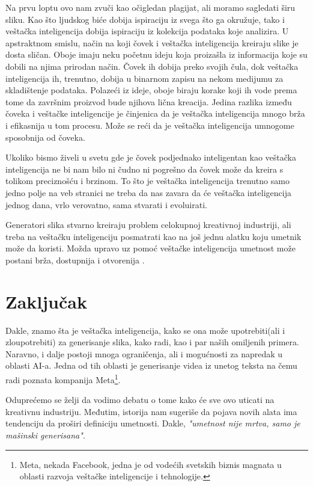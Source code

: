 \documentclass[12pt, letterpaper]{article}
\begin{document}
Na prvu loptu ovo nam zvuči kao očigledan plagijat, ali moramo sagledati širu sliku. Kao što ljudskog biće dobija ispiraciju iz svega što ga okružuje, tako i veštačka inteligencija dobija ispiraciju iz kolekcija podataka koje analizira. U apstraktnom smislu, način na koji čovek i veštačka inteligencija kreiraju slike je dosta sličan. Oboje imaju neku početnu ideju koja proizašla iz informacija koje su dobili na njima prirodan način. Čovek ih dobija preko svojih čula, dok veštačka inteligencija ih, trenutno, dobija u binarnom zapisu na nekom medijumu za skladištenje podataka. Polazeći iz ideje, oboje biraju korake koji ih vode prema tome da završnim proizvod bude njihova lična kreacija. Jedina razlika između čoveka i veštačke inteligencije je činjenica da je veštačka inteligencija mnogo brža i efikasnija u tom procesu. Može se reći da je veštačka inteligencija umnogome sposobnija od čoveka. 

Ukoliko bismo živeli u svetu gde je čovek podjednako inteligentan kao veštačka inteligencija ne bi nam bilo ni čudno ni pogrešno da čovek može da kreira s tolikom preciznošću i brzinom. To što je veštačka inteligencija trenutno samo jedno polje na veb stranici ne treba da nas zavara da će veštačka inteligencija jednog dana, vrlo verovatno, sama stvarati i evoluirati.

Generatori slika stvarno kreiraju problem celokupnoj kreativnoj industriji, ali treba na veštačku inteligenciju posmatrati kao na još jednu alatku koju umetnik može da koristi. Možda upravo uz pomoć veštačke inteligencija umetnost može postani brža, dostupnija i otvorenija \cite{fear}.

\pagebreak

\section{Zaključak}

Dakle, znamo šta je veštačka inteligencija, kako se ona može upotrebiti(ali i zloupotrebiti) za generisanje slika, kako radi, kao i par naših omiljenih primera. Naravno, i dalje postoji mnoga ograničenja, ali i mogućnosti za napredak u oblasti AI-a. Jedna od tih oblasti je generisanje videa iz unetog teksta na čemu radi poznata kompanija Meta\footnote{Meta, nekada Facebook, jedna je od vodećih svetskih biznis magnata u oblasti razvoja veštačke inteligencije i tehnologije.}. 

Oduprećemo se želji da vodimo debatu o tome kako će sve ovo uticati na kreativnu industriju. Međutim, istorija nam sugeriše da pojava novih alata ima tendenciju da proširi definiciju umetnosti. Dakle, \textit{"umetnost nije mrtva, samo je mašinski generisana"}\cite{clanaknov}.
\end{document}
